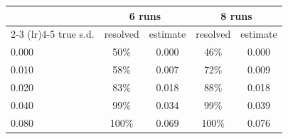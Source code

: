 \footnotesize
\setlength{\tabcolsep}{4pt}
\begin{tabular}{@{}lcccc@{}}
\toprule
& \multicolumn{2}{c}{6 runs} & \multicolumn{2}{c}{8 runs} \\
\cmidrule(lr){2-3} \cmidrule(lr){4-5}
true s.d. & resolved & estimate & resolved & estimate \\
\midrule
0.000 & 50\% & 0.000 & 46\% & 0.000 \\
0.010 & 58\% & 0.007 & 72\% & 0.009 \\
0.020 & 83\% & 0.018 & 88\% & 0.018 \\
0.040 & 99\% & 0.034 & 99\% & 0.039 \\
0.080 & 100\% & 0.069 & 100\% & 0.076 \\
\bottomrule
\end{tabular}